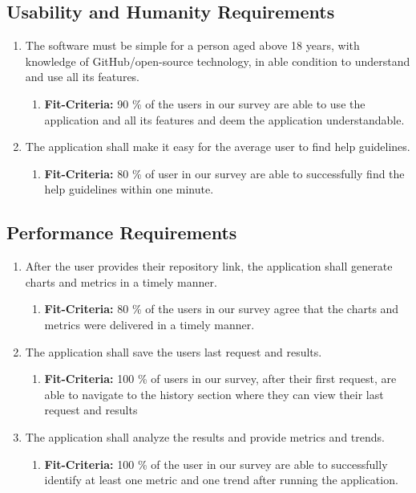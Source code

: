 \documentclass{article}
\begin{document}
\subsection{Usability and Humanity Requirements}
\begin{enumerate}
\item The software must be simple for a person aged above 18 years, with knowledge of GitHub/open-source technology, in able condition to understand and use all its features.
   \begin{enumerate}
    \item \textbf{Fit-Criteria:}  90 \% of the users in our survey are able to use the application and all its features and deem the application understandable.  
    \end{enumerate}
\item The application shall make it easy for the average user to find help guidelines.
   \begin{enumerate}
    \item \textbf{Fit-Criteria:}  80 \% of user in our survey are able to successfully find the help guidelines within one minute.
    \end{enumerate}
\end{enumerate}


\subsection{Performance Requirements}
\begin{enumerate}
\item After the user provides their repository link, the application shall generate charts and metrics in a timely manner. 
   \begin{enumerate}
    \item \textbf{Fit-Criteria:}  80 \% of the users in our survey agree that the charts and metrics were delivered in a timely manner. 
    \end{enumerate}
\item The application shall save the users last request and results. 
   \begin{enumerate}
    \item \textbf{Fit-Criteria:}  100 \% of users  in our survey, after their first request,  are able to navigate to the  history section where they can view their last request and results
    \end{enumerate}
\item The application shall analyze the results and provide metrics and trends. 
   \begin{enumerate}
    \item \textbf{Fit-Criteria:}   100 \% of the user in our survey are able to successfully identify at least one metric and one trend after running the application. 
    \end{enumerate}
\end{enumerate}
\end{document}
